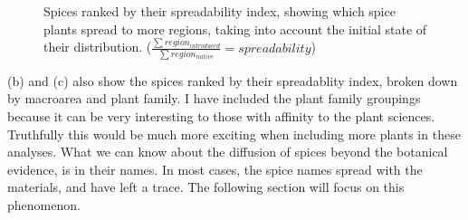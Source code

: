 \begin{figure}[!ht]



	\caption{Spices ranked by their spreadability index, showing which spice plants spread to more regions, taking into account the initial state of their distribution. ($ \frac{\sum region_{introduced}}{\sum region_{native}} = spreadability $)}
	\label{fig:spreadability}
\end{figure}



 (b) and (c) also show the spices ranked by their spreadablity index, broken down by macroarea and plant family. I have included the plant family groupings because it can be very interesting to those with affinity to the plant sciences. Truthfully this would be much more exciting when including more plants in these analyses. What we can know about the diffusion of spices beyond the botanical evidence, is in their names. In most cases, the spice names spread with the materials, and have left a trace. The following section will focus on this phenomenon.


